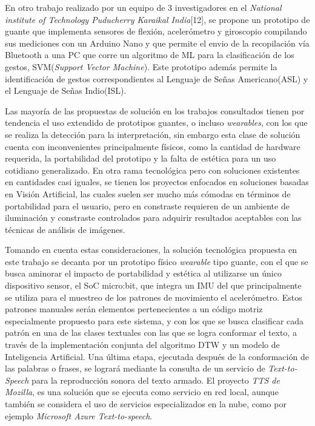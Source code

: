 \hfill \break
\justifying
En otro trabajo realizado por un equipo de 3 investigadores en el \textit{National institute of Technology Puducherry Karaikal India}[12], se propone un prototipo de guante que implementa sensores de flexión, acelerómetro y giroscopio compilando sus mediciones con un Arduino Nano y que permite el envio de la recopilación vía Bluetooth a una PC que corre un algoritmo de ML para la clasificación de los gestos, SVM(\textit{Support Vector Machine}). Este prototipo además permite la identificación de gestos correspondientes al Lenguaje de Señas Americano(ASL) y el Lenguaje de Señas Indio(ISL).

\hfill \break
\justifying
Las mayoría de las propuestas de solución en los trabajos consultados tienen por tendencia el uso extendido de prototipos guantes, o incluso \textit{wearables}, con los que se realiza la detección para la interpretación, sin embargo esta clase de solución cuenta con inconvenientes principalmente físicos, como la cantidad de hardware requerida, la portabilidad del prototipo y la falta de estética para un uso cotidiano generalizado. En otra rama tecnológica pero con soluciones existentes en cantidades casi iguales, se tienen los proyectos enfocados en soluciones basadas en Visión Artificial, las cuales suelen ser mucho más cómodas en términos de portabilidad para el usuario, pero en constraste requieren de un ambiente de iluminación y constraste controlados para adquirir resultados aceptables con las técnicas de análisis de imágenes.

\hfill \break
\justifying
Tomando en cuenta estas consideraciones, la solución tecnológica propuesta en este trabajo se decanta por un prototipo físico \textit{wearable} tipo guante, con el que se busca aminorar el impacto de portabilidad y estética al utilizarse un único dispositivo sensor, el SoC micro:bit, que integra un IMU del que principalmente se utiliza para el muestreo de los patrones de movimiento el acelerómetro. Estos patrones manuales serán elementos pertenecientes a un código motriz especialmente propuesto para este sistema, y con los que se busca clasificar cada patrón en una de las clases textuales con las que se logra conformar el texto, a través de la implementación conjunta del algoritmo DTW y un modelo de Inteligencia Artificial.
Una última etapa, ejecutada después de la conformación de las palabras o frases, se logrará mediante la consulta de un servicio de \textit{Text-to-Speech} para la reproducción sonora del texto armado. El proyecto \textit{TTS de Mozilla}, es una solución que se ejecuta como servicio en red local, aunque también se considera el uso de servicios especializados en la nube, como por ejemplo \textit{Microsoft Azure Text-to-speech}.





